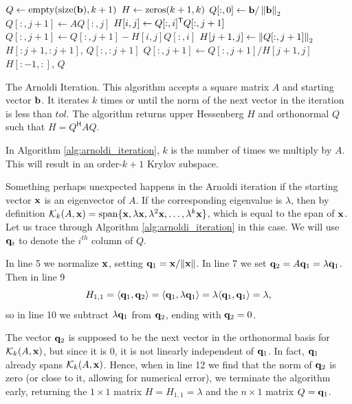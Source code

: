 \begin{algorithm}
\begin{algorithmic}[1]
	\State $Q \gets \allocate{\size{\b}}{k+1}$			
	\State $H \gets \zeros{ k+1}{ k}$
	\State $Q[:,0] \gets {\bf b}/\left\lVert{\bf b}\right\rVert_2$							
								
		\State $Q[:,j+1] \gets AQ[:,j]$		
							
			\State $H[i,j] \gets Q[:,i]^{\mathsf T} Q[:,j+1]$		
			\State $Q[:,j+1] \gets Q[:,j+1] - H[i,j] Q[:,i]$
		\EndFor
		\State $H[j+1,j] \gets \left\lVert Q[:,j+1]\right\rVert_2$			
            					
			\State {} $H[:j+1,:j+1]$, $Q[:,:j+1]$
		\EndIf
		\State $Q[:,j+1] \gets Q[:,j+1]/H[j+1,j]$				
	\EndFor
	\State {} $H[:-1, :]$, $Q$			
\EndProcedure
\end{algorithmic}
\caption{The Arnoldi Iteration. This algorithm accepts a square matrix $A$ and starting vector ${\bf b}$. It iterates $k$ times or until the norm of the next vector in the iteration is less than $tol$.
The algorithm returns upper Hessenberg $H$ and orthonormal $Q$ such that $H = Q^{\mathsf{H}}AQ$.}
\label{alg:arnoldi_iteration}
\end{algorithm}


In Algorithm \ref{alg:arnoldi_iteration}, $k$ is the number of times we multiply by $A$.
This will result in an order-$k+1$ Krylov subspace.

Something perhaps unexpected happens in the Arnoldi iteration if the starting vector ${\bf x}$ is an eigenvector of $A$.
If the corresponding eigenvalue is $\lambda$, then by definition $\mathcal{K}_k(A, {\bf x})=\text{span}\{{\bf x}, \lambda {\bf x}, \lambda^2{\bf x}, \ldots, \lambda^k {\bf x}\}$, which is equal to the span of ${\bf x}$.
Let us trace through Algorithm \ref{alg:arnoldi_iteration} in this case. We will use ${\bf q}_i$ to denote the $i^{th}$ column of $Q$.

In line 5 we normalize ${\bf x}$, setting ${\bf q}_1 = {\bf x}/\|{\bf x}\|$. 
In line 7 we set ${\bf q}_2 = A{\bf q}_1 = \lambda {\bf q}_1$.
Then in line 9
\[
H_{1,1} = \langle {\bf q}_1, {\bf q}_2 \rangle = \langle {\bf q}_1, \lambda {\bf q}_1 \rangle = \lambda \langle {\bf q}_1, {\bf q}_1 \rangle = \lambda,
\]
so in line 10 we subtract $\lambda {\bf q}_1$ from ${\bf q}_2$, ending with ${\bf q}_2=0$.

The vector ${\bf q}_2$ is supposed to be the next vector in the orthonormal basis for $\mathcal{K}_k(A, {\bf x})$, but since it is 0, it is not linearly independent of ${\bf q}_1$. In fact, ${\bf q}_1$ already spans $\mathcal{K}_k(A, {\bf x})$.
Hence, when in line 12 we find that the norm of ${\bf q}_2$ is zero (or close to it, allowing for numerical error), we terminate the algorithm early, returning the $1\times 1$ matrix $H = H_{1, 1}=\lambda$ and the $n\times 1$ matrix $Q = {\bf q}_1$.

